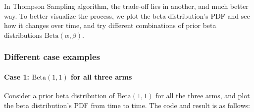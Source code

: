 \documentclass[11pt]{article}
\begin{document}
In Thompson Sampling algorithm, the trade-off lies in another, and much
better way. To better visualize the process, we plot the beta
distribution's PDF and see how it changes over time, and try different
combinations of prior beta distributions
\(\mathrm{Beta}(\alpha, \beta)\).

\hypertarget{different-case-examples}{%
\subsubsection{Different case examples}\label{different-case-examples}}

\hypertarget{case-1-mathrmbeta11-for-all-three-arms}{%
\paragraph{\texorpdfstring{Case 1: \(\mathrm{Beta}(1,1)\) for all three
arms}{Case 1: \textbackslash mathrm\{Beta\}(1,1) for all three arms}}\label{case-1-mathrmbeta11-for-all-three-arms}}

    Consider a prior beta distribution of \(\mathrm{Beta}(1,1)\) for all the
three arms, and plot the beta distribution's PDF from time to time. The
code and result is as follows:
\end{document}

